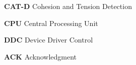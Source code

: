 {\bfseries C\+A\+T-\/\+D} Cohesion and Tension Detection

{\bfseries C\+P\+U} Central Processing Unit

{\bfseries D\+D\+C} Device Driver Control

{\bfseries A\+C\+K} Acknowledgment 